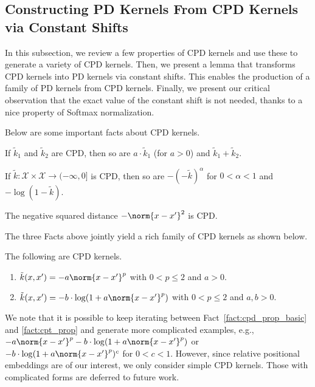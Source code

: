 \subsection{Constructing PD Kernels From CPD Kernels via Constant Shifts}

In this subsection, we review a few properties of CPD kernels and use these to generate a variety of CPD kernels. Then, we present a lemma that transforms CPD kernels into PD kernels via constant shifts. This enables the production of a family of PD kernels from CPD kernels. Finally, we present our critical observation that the exact value of the constant shift is not needed, thanks to a nice property of Softmax normalization.

Below are some important facts about CPD kernels.
\begin{fact}
    If $\tilde{k}_1$ and $\tilde{k}_2$ are CPD, then so are $a\cdot \tilde{k}_1$ (for $a>0$) and $\tilde{k}_1+\tilde{k}_2$.
    \label{fact:cpd_prop_basic}
\end{fact}
\begin{fact}
    If $\tilde{k}:\mathcal{X}\times\mathcal{X}\rightarrow (-\infty,0]$ is CPD, then so are $-(-\tilde{k})^\alpha$ for $0<\alpha<1$ and $-\log(1-\tilde{k})$.
    \label{fact:cpt_prop}
\end{fact}
\begin{fact}
    The negative squared distance $-\norm{x-x'}^2$ is CPD.
    \label{fact:negdis_prop}
\end{fact}

The three Facts above jointly yield a rich family of CPD kernels as shown below.

\begin{corollary}
    The following are CPD kernels.
    \begin{enumerate}[topsep=-3pt, itemsep=-3pt,label=(\alph*)]
        \item $\tilde{k}(x,x')=-a\norm{x-x'}^p$ with $0<p\leq 2$ and $a>0$.
        \item $\tilde{k}(x,x')=-b\cdot \log(1+a\norm{x-x'}^p)$ with $0<p\leq 2$ and $a,b>0$.
    \end{enumerate}
    \label{cor:cpd_examples}
\end{corollary}
We note that it is possible to keep iterating between Fact~\ref{fact:cpd_prop_basic} and \ref{fact:cpt_prop} and generate more complicated examples, e.g., $-a\norm{x-x'}^p-b\cdot \log(1+a\norm{x-x'}^p)$ or $-b\cdot \log(1+a\norm{x-x'}^p)^c$ for $0<c<1$. However, since relative positional embeddings are of our interest, we only consider simple CPD kernels. Those with complicated forms are deferred to future work.

